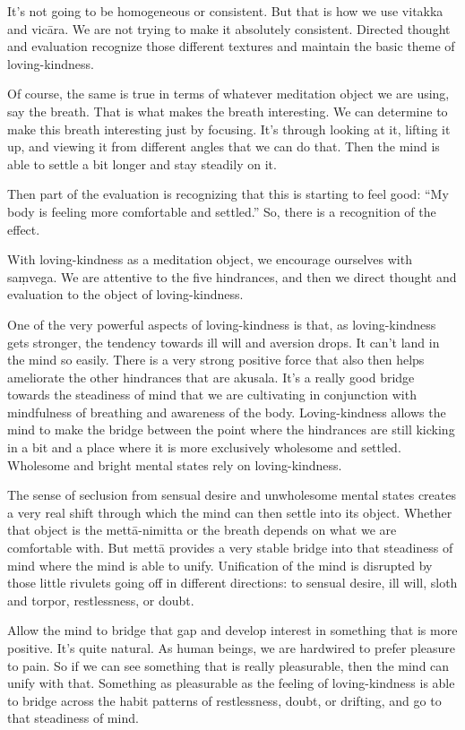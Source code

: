 It’s not going to be homogeneous or consistent. But that is how we use
vitakka and vicāra. We are not trying to make it absolutely consistent.
Directed thought and evaluation recognize those different textures and
maintain the basic theme of loving-kindness.

Of course, the same is true in terms of whatever meditation object we
are using, say the breath. That is what makes the breath interesting. We
can determine to make this breath interesting just by focusing. It’s
through looking at it, lifting it up, and viewing it from different
angles that we can do that. Then the mind is able to settle a bit longer
and stay steadily on it.

Then part of the evaluation is recognizing that this is starting to feel
good: “My body is feeling more comfortable and settled.” So, there is a
recognition of the effect.

With loving-kindness as a meditation object, we encourage ourselves with
saṃvega. We are attentive to the five hindrances, and then we direct
thought and evaluation to the object of loving-kindness.

One of the very powerful aspects of loving-kindness is that, as
loving-kindness gets stronger, the tendency towards ill will and
aversion drops. It can’t land in the mind so easily. There is a very
strong positive force that also then helps ameliorate the other
hindrances that are akusala. It’s a really good bridge towards the
steadiness of mind that we are cultivating in conjunction with
mindfulness of breathing and awareness of the body. Loving-kindness
allows the mind to make the bridge between the point where the
hindrances are still kicking in a bit and a place where it is more
exclusively wholesome and settled. Wholesome and bright mental states
rely on loving-kindness.

The sense of seclusion from sensual desire and unwholesome mental states
creates a very real shift through which the mind can then settle into
its object. Whether that object is the mettā-nimitta or the breath
depends on what we are comfortable with. But mettā provides a very
stable bridge into that steadiness of mind where the mind is able to
unify. Unification of the mind is disrupted by those little rivulets
going off in different directions: to sensual desire, ill will, sloth
and torpor, restlessness, or doubt.

Allow the mind to bridge that gap and develop interest in something that
is more positive. It’s quite natural. As human beings, we are hardwired
to prefer pleasure to pain. So if we can see something that is really
pleasurable, then the mind can unify with that. Something as pleasurable
as the feeling of loving-kindness is able to bridge across the habit
patterns of restlessness, doubt, or drifting, and go to that steadiness
of mind.

